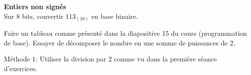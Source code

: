 \begin{Exercice}[5 minutes] \textbf{Entiers non signés}\\
	Sur 8 bits, convertir 113$_{(10)}$ en base binaire.
   
    \begin{conseil}
		Faire un tableau comme présenté dans la diapositive 15 du cours (programmation de base). Essayer de décomposer le nombre en une somme de puissances de 2.
    \end{conseil}
    
    \begin{solution}
        Méthode 1: Utiliser la division par 2 comme vu dans la première séance d'exercices.\\

        \begin{center}
        \begin{minipage}{0.3\textwidth}
    \centering


\end{minipage}
\end{center}
\end{solution}
\end{Exercice}
